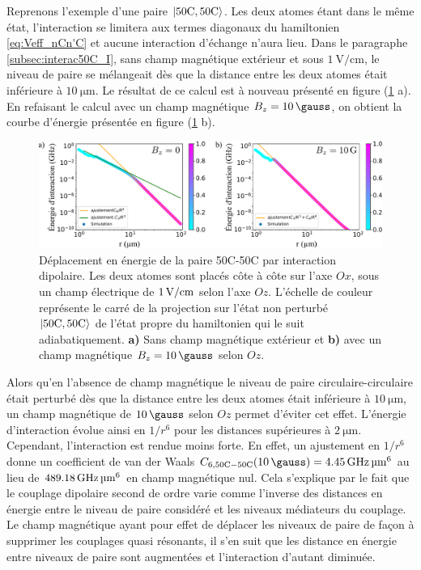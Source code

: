 Reprenons l'exemple d'une paire $\ket{\mathrm{50C,50C}}$.
Les deux atomes étant dans le même état, l'interaction se limitera aux termes diagonaux du hamiltonien \eqref{eq:Veff_nCn'C} et aucune interaction d'échange n'aura lieu.
Dans le paragraphe \ref{subsec:interac50C_I}, sans champ magnétique extérieur et sous $\SI{1}{\V/\cm}$, le niveau de paire se mélangeait dès que la distance entre les deux atomes était inférieure à $\SI{10}{\um}$.
Le résultat de ce calcul est à nouveau présenté en figure (\ref{fig:VdW_50C50C_1Vcm_10G} a).
En refaisant le calcul avec un champ magnétique $B_z=\SI{10}{\gauss}$, on obtient la courbe d'énergie présentée en figure (\ref{fig:VdW_50C50C_1Vcm_10G} b).
%
\begin{figure}[h]
\centering
\includegraphics[width=\linewidth]{figures/circsim/VdW_50C50C_1Vcm_0_10G}
\caption[Interaction dipolaire 50C-50C en présence d'un champ magnétique]{
Déplacement en énergie de la paire 50C-50C par interaction dipolaire.
Les deux atomes sont placés côte à côte sur l'axe $Ox$, sous un champ électrique de $\SIvv{1}{\V / \cm}$ selon l'axe $Oz$. L'échelle de couleur représente le carré de la projection sur l'état non perturbé $\ket{50\text{C},50\text{C}}$ de l'état propre du hamiltonien qui le suit adiabatiquement.
\textbf{a)} Sans champ magnétique extérieur et \textbf{b)} avec un champ magnétique $B_z = \SI{10}{\gauss}$ selon $Oz$.
}
\label{fig:VdW_50C50C_1Vcm_10G}
\end{figure}
%
Alors qu'en l'absence de champ magnétique le niveau de paire circulaire-circulaire était perturbé dès que la distance entre les deux atomes était inférieure à $\SI{10}{\um}$, un champ magnétique de $\SI{10}{\gauss}$ selon $Oz$ permet d'éviter cet effet.
L'énergie d'interaction évolue ainsi en $1/r^6$ pour les distances supérieures à $\SI{2}{\um}$.
Cependant, l'interaction est rendue moins forte.
En effet, un ajustement en $1/r^6$ donne un coefficient de van der Waals $C_{6,\mathrm{50C-50C}}(\SI{10}{\gauss}) = \SI{4.45}{\GHz\raiseto{6}\um}$ au lieu de $\SI{489.18}{\GHz\raiseto{6}\um}$ en champ magnétique nul.
Cela s'explique par le fait que le couplage dipolaire second de ordre varie comme l'inverse des distances en énergie entre le niveau de paire considéré et les niveaux médiateurs du couplage.
Le champ magnétique ayant pour effet de déplacer les niveaux de paire de façon à supprimer les couplages quasi résonants, il s'en suit que les distance en énergie entre niveaux de paire sont augmentées et l'interaction d'autant diminuée.

